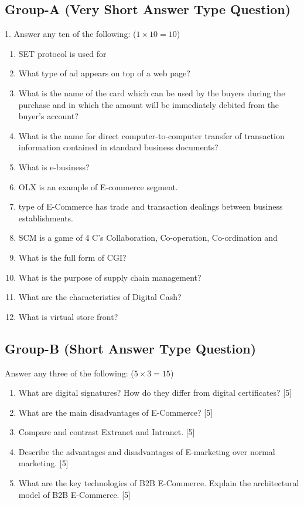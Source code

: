 \documentclass{article}
\begin{document}
\subsection*{Group-A (Very Short Answer Type Question)}
1. Answer any ten of the following: ($1 \times 10 = 10$)
\begin{enumerate}
    \item[(I)] SET protocol is used for \underline{\hspace{2cm}}
    \item[(II)] What type of ad appears on top of a web page?
    \item[(III)] What is the name of the card which can be used by the buyers during the purchase and in which the amount will be immediately debited from the buyer's account?
    \item[(IV)] What is the name for direct computer-to-computer transfer of transaction information contained in standard business documents?
    \item[(V)] What is e-business?
    \item[(VI)] OLX is an example of \underline{\hspace{2cm}} E-commerce segment.
    \item[(VII)] \underline{\hspace{2cm}} type of E-Commerce has trade and transaction dealings between business establishments.
    \item[(VIII)] SCM is a game of 4 C's Collaboration, Co-operation, Co-ordination and \underline{\hspace{2cm}}
    \item[(IX)] What is the full form of CGI?
    \item[(X)] What is the purpose of supply chain management?
    \item[(XI)] What are the characteristics of Digital Cash?
    \item[(XII)] What is virtual store front?
\end{enumerate}

\subsection*{Group-B (Short Answer Type Question)}
Answer any three of the following: ($5 \times 3 = 15$)
\begin{enumerate}
    \item[2.] What are digital signatures? How do they differ from digital certificates? [5]
    \item[3.] What are the main disadvantages of E-Commerce? [5]
    \item[4.] Compare and contrast Extranet and Intranet. [5]
    \item[5.] Describe the advantages and disadvantages of E-marketing over normal marketing. [5]
    \item[6.] What are the key technologies of B2B E-Commerce. Explain the architectural model of B2B E-Commerce. [5]
\end{enumerate}
\end{document}
